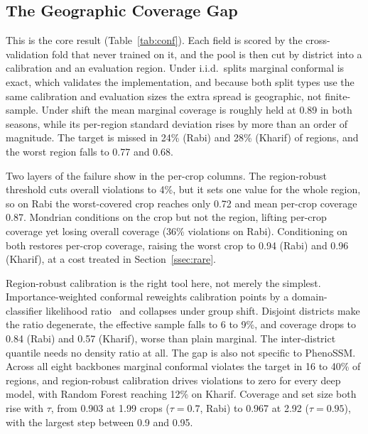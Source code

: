 \documentclass[conference]{IEEEtran}
\begin{document}
\subsection{The Geographic Coverage Gap}\label{ssec:geoshift}
This is the core result (Table~\ref{tab:conf}). Each field is scored by the
cross-validation fold that never trained on it, and the pool is then cut by district
into a calibration and an evaluation region. Under i.i.d.\ splits marginal conformal
is exact, which validates the implementation, and because both split types use the
same calibration and evaluation sizes the extra spread is geographic, not
finite-sample. Under shift the mean marginal coverage is roughly held at 0.89 in both
seasons, while its per-region standard deviation rises by more than an order of
magnitude. The target is missed in 24\% (Rabi) and 28\% (Kharif) of regions, and the
worst region falls to 0.77 and 0.68.

Two layers of the failure show in the per-crop columns. The region-robust threshold
cuts overall violations to 4\%, but it sets one value for the whole region, so on Rabi
the worst-covered crop reaches only 0.72 and mean per-crop coverage 0.87. Mondrian
conditions on the crop but not the region, lifting per-crop coverage yet losing
overall coverage (36\% violations on Rabi). Conditioning on both restores per-crop
coverage, raising the worst crop to 0.94 (Rabi) and 0.96 (Kharif), at a cost treated
in Section~\ref{ssec:rare}.

Region-robust calibration is the right tool here, not merely the simplest.
Importance-weighted conformal reweights calibration points by a domain-classifier
likelihood ratio~\cite{tibshirani2019covshift} and collapses under group shift.
Disjoint districts make the ratio degenerate, the effective sample falls to 6 to 9\%,
and coverage drops to 0.84 (Rabi) and 0.57 (Kharif), worse than plain marginal. The
inter-district quantile needs no density ratio at all. The gap is also not specific to
PhenoSSM. Across all eight backbones marginal conformal violates the target in 16 to
40\% of regions, and region-robust calibration drives violations to zero for every
deep model, with Random Forest reaching 12\% on Kharif. Coverage and set size both
rise with $\tau$, from 0.903 at 1.99 crops ($\tau{=}0.7$, Rabi) to 0.967 at 2.92
($\tau{=}0.95$), with the largest step between 0.9 and 0.95.
\end{document}

